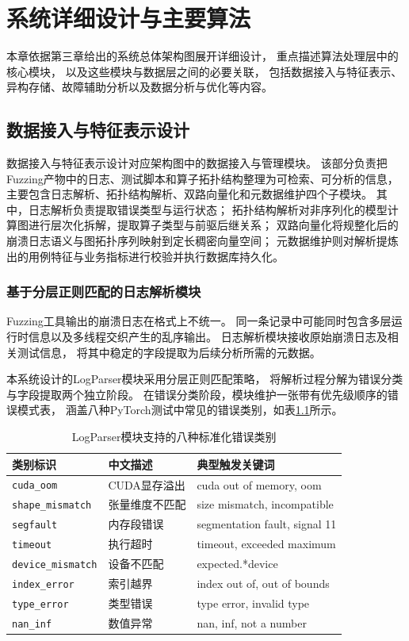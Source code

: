 \chapter{系统详细设计与主要算法}

本章依据第三章给出的系统总体架构图展开详细设计，
重点描述算法处理层中的核心模块，
以及这些模块与数据层之间的必要关联，
包括数据接入与特征表示、异构存储、故障辅助分析以及数据分析与优化等内容。

\section{数据接入与特征表示设计}

数据接入与特征表示设计对应架构图中的数据接入与管理模块。
该部分负责把Fuzzing产物中的日志、测试脚本和算子拓扑结构整理为可检索、可分析的信息，主要包含日志解析、拓扑结构解析、双路向量化和元数据维护四个子模块。
其中，日志解析负责提取错误类型与运行状态；
拓扑结构解析对非序列化的模型计算图进行层次化拆解，提取算子类型与前驱后继关系；
双路向量化将规整化后的崩溃日志语义与图拓扑序列映射到定长稠密向量空间；
元数据维护则对解析提炼出的用例特征与业务指标进行校验并执行数据库持久化。

\subsection{基于分层正则匹配的日志解析模块}

Fuzzing工具输出的崩溃日志在格式上不统一。
同一条记录中可能同时包含多层运行时信息以及多线程交织产生的乱序输出。
日志解析模块接收原始崩溃日志及相关测试信息，
将其中稳定的字段提取为后续分析所需的元数据。

本系统设计的LogParser模块采用分层正则匹配策略，
将解析过程分解为错误分类与字段提取两个独立阶段。
在错误分类阶段，模块维护一张带有优先级顺序的错误模式表，
涵盖八种PyTorch测试中常见的错误类别，如表\ref{tab:error_categories}所示。

\begin{table}[htbp]
\centering
\caption{LogParser模块支持的八种标准化错误类别}
\label{tab:error_categories}
\begin{tabular}{lll}
\toprule
类别标识 & 中文描述 & 典型触发关键词 \\
\midrule
\texttt{cuda\_oom} & CUDA显存溢出 & cuda out of memory, oom \\
\texttt{shape\_mismatch} & 张量维度不匹配 & size mismatch, incompatible \\
\texttt{segfault} & 内存段错误 & segmentation fault, signal 11 \\
\texttt{timeout} & 执行超时 & timeout, exceeded maximum \\
\texttt{device\_mismatch} & 设备不匹配 & expected.*device \\
\texttt{index\_error} & 索引越界 & index out of, out of bounds \\
\texttt{type\_error} & 类型错误 & type error, invalid type \\
\texttt{nan\_inf} & 数值异常 & nan, inf, not a number \\
\bottomrule
\end{tabular}
\end{table}

